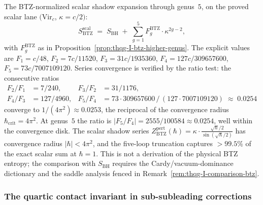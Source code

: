 \begin{computation}
\label{comp:btz-five-loop}%
%
The BTZ-normalized scalar shadow expansion through genus~$5$, on the
proved scalar lane
$(\mathrm{Vir}_c$, $\kappa = c/2)$:
\begin{equation}\label{eq:btz-five-loop}
S_{\mathrm{BTZ}}^{\mathrm{scal}}
\;=\;
S_{\mathrm{BH}}
\;+\;
\sum_{g=1}^{5} F_g^{\mathrm{BTZ}} \cdot \kappa^{2g-2},
\end{equation}
with $F_g^{\mathrm{BTZ}}$ as in
Proposition~\textup{\ref{prop:thqg-I-btz-higher-genus}}.
The explicit values are $F_1 = c/48$,
$F_2 = 7c/11520$,
$F_3 = 31c/1935360$,
$F_4 = 127c/309657600$,
$F_5 = 73c/7007109120$.
Series convergence is verified by the ratio test:
the consecutive ratios
\begin{align*}
F_2/F_1 &= 7/240, &
F_3/F_2 &= 31/1176, \\
F_4/F_3 &= 127/4960, &
F_5/F_4 &= 73 \cdot 309657600\,/\,(127 \cdot 7007109120)
\;\approx\; 0.0254
\end{align*}
converge to $1/(4\pi^2) \approx 0.0253$, the reciprocal of
the convergence radius $\hbar_{\mathrm{crit}} = 4\pi^2$.
At genus~$5$ the ratio is $|F_5/F_4| = 2555/100584
\approx 0.0254$, well within the convergence disk.
The scalar shadow series
$Z_{\mathrm{BTZ}}^{\mathrm{pert}}(\hbar)
= \kappa \cdot \frac{\sqrt{\hbar}/2}{\sin(\sqrt{\hbar}/2)}$
has convergence radius $|\hbar| < 4\pi^2$, and the five-loop
truncation captures $>99.5\%$ of the exact scalar sum at
$\hbar = 1$.
This is not a derivation of the physical BTZ entropy; the comparison
with $S_{\mathrm{BH}}$ requires the Cardy/vacuum-dominance dictionary
and the saddle analysis fenced in Remark~\ref{rem:thqg-I-comparison-btz}.
\end{computation}

\subsubsection{The quartic contact invariant in sub-subleading corrections}

